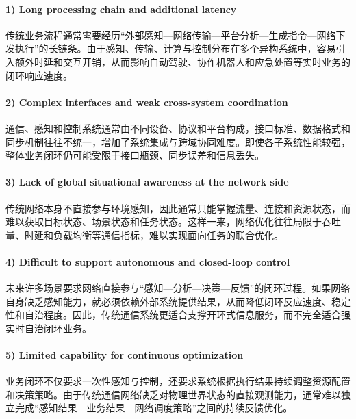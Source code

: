 \paragraph{1) Long processing chain and additional latency}
传统业务流程通常需要经历“外部感知—网络传输—平台分析—生成指令—网络下发执行”的长链条。由于感知、传输、计算与控制分布在多个异构系统中，容易引入额外时延和交互开销\cite{Letaief2019Roadmap, Saad2020Vision6G}，从而影响自动驾驶、协作机器人和应急处置等实时业务的闭环响应速度。

\paragraph{2) Complex interfaces and weak cross-system coordination}
通信、感知和控制系统通常由不同设备、协议和平台构成，接口标准、数据格式和同步机制往往不统一，增加了系统集成与跨域协同难度。即使各子系统性能较强，整体业务闭环仍可能受限于接口瓶颈、同步误差和信息丢失。

\paragraph{3) Lack of global situational awareness at the network side}
传统网络本身不直接参与环境感知，因此通常只能掌握流量、连接和资源状态，而难以获取目标状态、场景状态和任务状态。这样一来，网络优化往往局限于吞吐量、时延和负载均衡等通信指标，难以实现面向任务的联合优化。

\paragraph{4) Difficult to support autonomous and closed-loop control}
未来许多场景要求网络直接参与“感知—分析—决策—反馈”的闭环过程\cite{Saad2020Vision6G, Liu2022ISAC}。如果网络自身缺乏感知能力，就必须依赖外部系统提供结果，从而降低闭环反应速度、稳定性和自治程度。因此，传统通信系统更适合支撑开环式信息服务，而不完全适合强实时自治闭环业务。

\paragraph{5) Limited capability for continuous optimization}
业务闭环不仅要求一次性感知与控制，还要求系统根据执行结果持续调整资源配置和决策策略。由于传统通信网络缺乏对物理世界状态的直接观测能力，通常难以独立完成“感知结果—业务结果—网络调度策略”之间的持续反馈优化\cite{IMT2030Framework, Letaief2019Roadmap}。

